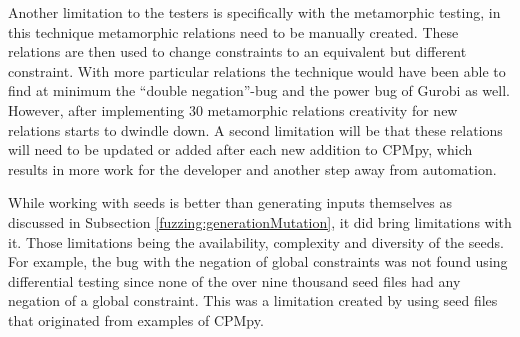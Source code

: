 Another limitation to the testers is specifically with the metamorphic testing, in this technique metamorphic relations need to be manually created. These relations are then used to change constraints to an equivalent but different constraint. With more particular relations the technique would have been able to find at minimum the “double negation”-bug and the power bug of Gurobi as well. However, after implementing 30 metamorphic relations creativity for new relations starts to dwindle down. A second limitation will be that these relations will need to be updated or added after each new addition to CPMpy, which results in more work for the developer and another step away from automation.


While working with seeds is better than generating inputs themselves as discussed in Subsection \ref{fuzzing:generationMutation}, it did bring limitations with it. Those limitations being the availability, complexity and diversity of the seeds. For example, the bug with the negation of global constraints was not found using differential testing since none of the over nine thousand seed files had any negation of a global constraint. This was a limitation created by using seed files that originated from examples of CPMpy.




